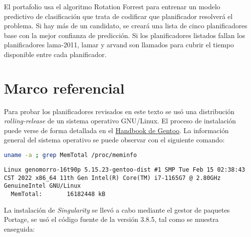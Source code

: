 \documentclass[a4paper,12pt,twocolumn]{article}
\begin{document}
  

El portafolio usa el algoritmo Rotation Forrest para entrenar un modelo predictivo de clasificación que trata de codificar que planificador resolverá el problema. Si hay más de un candidato, se creará una lista de cinco planificadores base con la mejor confianza de predicción. Si los planificadores listados fallan los planificadores lama-2011, lamar y arvand son llamados para cubrir el tiempo disponible entre cada planificador.

\section{Marco referencial}

Para probar los planificadores revisados en este texto se usó una distribución \textit{rolling-release} de un sistema operativo GNU/Linux. El proceso de instalación puede verse de forma detallada en el \href{https://wiki.gentoo.org/wiki/Handbook:Main_Page/es}{Handbook de Gentoo}\nocite{Gentoo_2021}. La información general del sistema operativo se puede observar con el siguiente comando:

\begin{lstlisting}[language=sh]
 uname -a ; grep MemTotal /proc/meminfo
\end{lstlisting}
\begin{lstlisting}[style=consola]
  Linux genomorro-16t90p 5.15.23-gentoo-dist #1 SMP Tue Feb 15 02:38:43 CST 2022 x86_64 11th Gen Intel(R) Core(TM) i7-1165G7 @ 2.80GHz GenuineIntel GNU/Linux
  MemTotal:       16182448 kB
\end{lstlisting}

La instalación de \emph{Singularity} se llevó a cabo mediante el gestor de paquetes Portage, se usó el código fuente de la versión 3.8.5, tal como se muestra enseguida:
\end{document}
